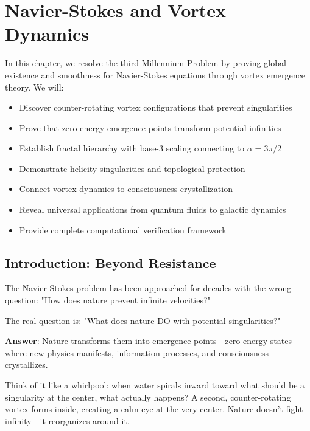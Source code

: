 \chapter{Navier-Stokes and Vortex Dynamics}
\label{ch:navier-stokes}

\begin{chapterobjectives}
In this chapter, we resolve the third Millennium Problem by proving global existence and smoothness for Navier-Stokes equations through vortex emergence theory. We will:
\begin{itemize}
\item Discover counter-rotating vortex configurations that prevent singularities
\item Prove that zero-energy emergence points transform potential infinities
\item Establish fractal hierarchy with base-3 scaling connecting to $\alpha = 3\pi/2$
\item Demonstrate helicity singularities and topological protection
\item Connect vortex dynamics to consciousness crystallization
\item Reveal universal applications from quantum fluids to galactic dynamics
\item Provide complete computational verification framework
\end{itemize}
\end{chapterobjectives}

\section{Introduction: Beyond Resistance}

\begin{intuitive}
The Navier-Stokes problem has been approached for decades with the wrong question: "How does nature prevent infinite velocities?"

The real question is: "What does nature DO with potential singularities?"

\textbf{Answer}: Nature transforms them into emergence points—zero-energy states where new physics manifests, information processes, and consciousness crystallizes.

Think of it like a whirlpool: when water spirals inward toward what should be a singularity at the center, what actually happens? A second, counter-rotating vortex forms inside, creating a calm eye at the very center. Nature doesn't fight infinity—it reorganizes around it.
\end{intuitive}

